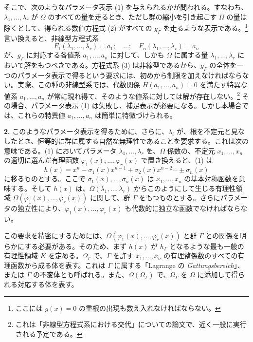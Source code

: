 \documentclass[11pt]{article}
\begin{document}
そこで、次のようなパラメータ表示 (1) を与えられるかが問われる。すなわち、$\lambda_1,
\ldots,\lambda_r$ が $\Omega$ のすべての量を走るとき、ただし群の縮小を引き起こす $\Omega$ の量は除くとして、得られる数値方程式 (2) がすべての $g_\Gamma$ を走るような表示である。\footnote{ここには $g(x)=0$ の重根の出現も数え入れなければならない。} 言い換えると、非線型方程式系
\begin{equation}\tag{3}
F_1(\lambda_1,
\ldots,\lambda_r)=a_1;\quad \ldots;\quad F_n(\lambda_1,
\ldots,\lambda_r)=a_n
\end{equation}
が、$g_\Gamma$ に対応する各値系 $a_1,
\ldots,a_n$ に対して、しかも $\Omega$ に属する量 $\lambda_1,
\ldots,\lambda_r$ において解をもつべきである。方程式系 (3) は非線型であるから、$g_\Gamma$ の全体を一つのパラメータ表示で得るという要求には、初めから制限を加えなければならない。実際、この種の非線型系では、代数関係 $H(a_1,
\ldots,a_n)=0$ を満たす特異な値系 $a_1,
\ldots,a_n$ が常に現れ得て、そのような値系に対しては解が存在しない。\footnote{これは「非線型方程式系における交代」についての論文で、近く一般に実行される予定である。} その場合、パラメータ表示 (1) は失敗し、補足表示が必要になる。しかし本場合では、これらの特異値 $a_1,
\ldots,a_n$ は簡単に特徴づけられる。

\textbf{2.} このようなパラメータ表示を得るために、さらに、$\lambda_i$ が、根を不定元と見なしたとき、恒等的に群に属する自然な無理性であることを要求する。これは次の意味である。(1) においてパラメータ $\lambda_1,
\ldots,\lambda_r$ を、$\Omega$ 係数の、不定元 $x_1,
\ldots,x_n$ の適切に選んだ有理函数 $\varphi_1(x),\ldots,\varphi_r(x)$ で置き換えると、(1) は
\begin{equation}\tag{4}
h(x)=x^n-\sigma_1(x)x^{n-1}+\sigma_2(x)x^{n-2}\cdots \pm \sigma_n(x)
\end{equation}
に移るものとする。ここで $\sigma_1(x),\ldots,\sigma_n(x)$ は $x_1,
\ldots,x_n$ の基本対称函数を意味する。そして $h(x)$ は、$\Omega(\lambda_1,
\ldots,\lambda_r)$ からこのようにして生じる有理性領域 $\Omega(\varphi_1(x),\ldots,\varphi_r(x))$ に関して、群 $\Gamma$ をもつものとする。さらにパラメータの独立性により、$\varphi_1(x),\ldots,\varphi_r(x)$ も代数的に独立な函数でなければならない。

この要求を精密にするためには、$\Omega(\varphi_1(x),\ldots,\varphi_r(x))$ と群 $\Gamma$ との関係を明らかにする必要がある。そのため、まず $h(x)$ が $h_\Gamma$ となるような最も一般の有理性領域 $K$ を定める。$\Omega_\Gamma$ で、$\Gamma$ を許す $x_1,
\ldots,x_n$ の有理整係数のすべての有理函数から成る体を表す。これは $\Gamma$ に属する「Lagrange の \emph{Gattungsbereich}」、または $\Gamma$ の不変体とも呼ばれる。また、$\Omega(\Omega_\Gamma)$ で、$\Omega_\Gamma$ を $\Omega$ に添加して得られる対応する体を表す。
\end{document}
